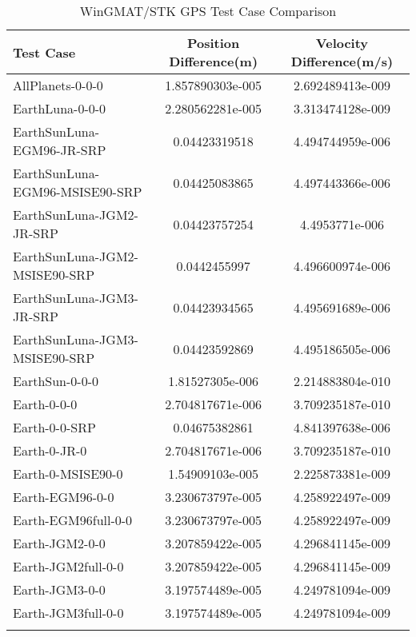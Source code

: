 \begin{table}[htbp!]
\centering
\caption{ WinGMAT/STK GPS Test Case Comparison}
      \begin{tabular}{lcc}
      \hline\hline
          Test Case & Position Difference(m) & Velocity Difference(m/s) \\
         \hline
         AllPlanets-0-0-0 & 1.857890303e-005 & 2.692489413e-009 \\
         EarthLuna-0-0-0 & 2.280562281e-005 & 3.313474128e-009 \\
         EarthSunLuna-EGM96-JR-SRP & 0.04423319518 & 4.494744959e-006 \\
         EarthSunLuna-EGM96-MSISE90-SRP & 0.04425083865 & 4.497443366e-006 \\
         EarthSunLuna-JGM2-JR-SRP & 0.04423757254 & 4.4953771e-006 \\
         EarthSunLuna-JGM2-MSISE90-SRP & 0.0442455997 & 4.496600974e-006 \\
         EarthSunLuna-JGM3-JR-SRP & 0.04423934565 & 4.495691689e-006 \\
         EarthSunLuna-JGM3-MSISE90-SRP & 0.04423592869 & 4.495186505e-006 \\
         EarthSun-0-0-0 & 1.81527305e-006 & 2.214883804e-010 \\
         Earth-0-0-0 & 2.704817671e-006 & 3.709235187e-010 \\
         Earth-0-0-SRP & 0.04675382861 & 4.841397638e-006 \\
         Earth-0-JR-0 & 2.704817671e-006 & 3.709235187e-010 \\
         Earth-0-MSISE90-0 & 1.54909103e-005 & 2.225873381e-009 \\
         Earth-EGM96-0-0 & 3.230673797e-005 & 4.258922497e-009 \\
         Earth-EGM96full-0-0 & 3.230673797e-005 & 4.258922497e-009 \\
         Earth-JGM2-0-0 & 3.207859422e-005 & 4.296841145e-009 \\
         Earth-JGM2full-0-0 & 3.207859422e-005 & 4.296841145e-009 \\
         Earth-JGM3-0-0 & 3.197574489e-005 & 4.249781094e-009 \\
         Earth-JGM3full-0-0 & 3.197574489e-005 & 4.249781094e-009 \\
      \hline\hline
      \label{Table: GPS WinGMAT-STK Table} 
\end{tabular}
\end{table}
